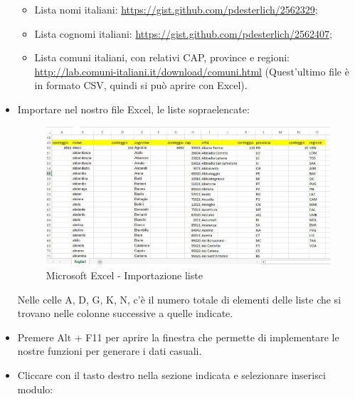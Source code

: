 \begin{itemize}
\begin{itemize}
\item Lista nomi italiani: \url{https://gist.github.com/pdesterlich/2562329};
\item Lista cognomi italiani: \url{https://gist.github.com/pdesterlich/2562407};
\item Lista comuni italiani, con relativi CAP, province e regioni: \newline\url{http://lab.comuni-italiani.it/download/comuni.html} (Quest’ultimo file è in formato CSV, quindi si può aprire con Excel).

\end{itemize}

\item Importare nel nostro file Excel, le liste sopraelencate:

\begin{center}
\begin{figure}[H]
\centering
\includegraphics[scale=0.8]{figures/list_import_excel.png}
\caption{Microsoft Excel - Importazione liste} 
\end{figure}
\end{center}

Nelle celle A, D, G, K, N, c’è il numero totale di elementi delle liste che si trovano nelle colonne successive a quelle indicate.

\item Premere Alt + F11 per aprire la finestra che permette di implementare le nostre funzioni per generare i dati casuali.  

\item Cliccare con il tasto destro nella sezione indicata e selezionare inserisci modulo:


\end{itemize}
